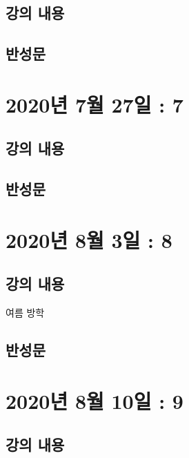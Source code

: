 \documentclass[12pt, a4paper, oneside]{book}
\let\stdsection\section
\renewcommand\section{\newpage\stdsection}
\begin{document}
		\subsection{강의 내용}

		\subsection{반성문}


%
	\section{2020년 7월 27일 : 7}

		\subsection{강의 내용}

		\subsection{반성문}


%
	\section{2020년 8월 3일 : 8}

		\subsection{강의 내용}
		여름 방학

		\subsection{반성문}


%
	\section{2020년 8월 10일 : 9}

		\subsection{강의 내용}
\end{document}
